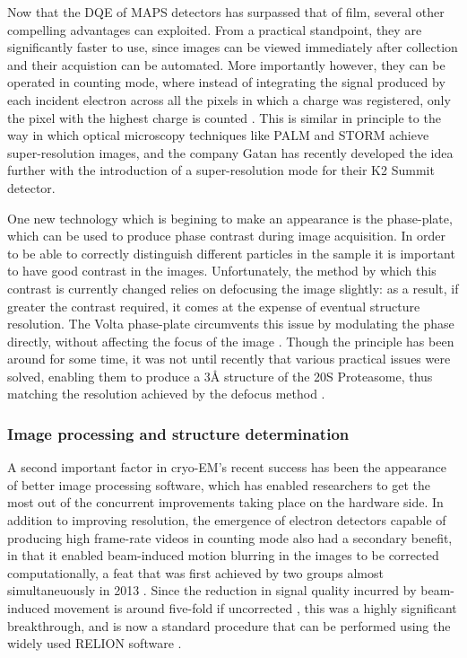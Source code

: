 \documentclass[a4paper,11pt,twoside,openright]{scrbook}
\begin{document}
Now that the DQE of MAPS detectors has surpassed that of film, several other compelling advantages can exploited. From a practical standpoint, they are significantly faster to use, since images can be viewed immediately after collection and their acquistion can be automated. More importantly however, they can be operated in counting mode, where instead of integrating the signal produced by each incident electron across all the pixels in which a charge was registered, only the pixel with the highest charge is counted \cite{McMullan2009a}. This is similar in principle to the way in which optical microscopy techniques like PALM \cite{Betzig2006} and STORM \cite{Rust2006} achieve super-resolution images, and the company Gatan has recently developed the idea further with the introduction of a super-resolution mode for their K2 Summit detector.

One new technology which is begining to make an appearance is the phase-plate, which can be used to produce phase contrast during image acquisition. In order to be able to correctly distinguish different particles in the sample it is important to have good contrast in the images. Unfortunately, the method by which this contrast is currently changed relies on defocusing the image slightly: as a result, if greater the contrast required, it comes at the expense of eventual structure resolution. The Volta phase-plate circumvents this issue by modulating the phase directly, without affecting the focus of the image \cite{Danev2014}. Though the principle has been around for some time, it was not until recently that various practical issues were solved, enabling them to produce a 3Å structure of the 20S Proteasome, thus matching the resolution achieved by the defocus method \cite{Danev2016}.

\subsubsection{Image processing and structure determination}
A second important factor in cryo-EM's recent success has been the appearance of better image processing software, which has enabled researchers to get the most out of the concurrent improvements taking place on the hardware side. In addition to improving resolution, the emergence of electron detectors capable of producing high frame-rate videos in counting mode also had a secondary benefit, in that it enabled beam-induced motion blurring in the images to be corrected computationally, a feat that was first achieved by two groups almost simultaneuously in 2013 \cite{Bai2013, Li2013}. Since the reduction in signal quality incurred by beam-induced movement is around five-fold if uncorrected \cite{Henderson1985}, this was a highly significant breakthrough, and is now a standard procedure that can be performed using the widely used RELION software \cite{Scheres2012,Scheres2014}.
\end{document}
